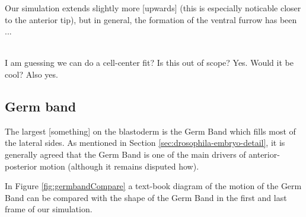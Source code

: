 Our simulation extends slightly more [upwards] (this is especially noticable closer to the anterior tip), but in general, the formation of the ventral furrow has been ...

\\
I am guessing we can do a cell-center fit?
Is this out of scope? Yes. Would it be cool? Also yes.
\subsection{Germ band}
The largest [something] on the blastoderm is the Germ Band which fills most of the lateral sides. As mentioned in Section \ref{sec:drosophila-embryo-detail}, it is generally agreed that the Germ Band is one of the main drivers of anterior-posterior motion (although it remains disputed how).

In Figure \ref{fig:germbandCompare} a text-book diagram of the motion of the Germ Band can be compared with the shape of the Germ Band in the first and last frame of our simulation. 

